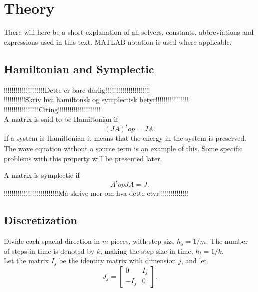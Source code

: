 

\chapter{Theory}
There will here be a short explanation of all solvers, constants, abbreviations and expressions used in this text. MATLAB notation is used where applicable. 

\section{Hamiltonian and Symplectic}%
!!!!!!!!!!!!!!!!!!!!!Dette er bare dårlig!!!!!!!!!!!!!!!!!!!!!!!\\
!!!!!!!!!!!Skriv hva hamiltonsk og symplectisk betyr!!!!!!!!!!!!!!!!!\\
!!!!!!!!!!!!!!!!!!Citing!!!!!!!!!!!!!!!!!!!!!!\\
A matrix is said to be Hamiltonian if 
\begin{equation}
(JA)^top = JA.
\end{equation}
If a system is Hamiltonian it means that the energy in the system is preserved. The wave equation without a source term is an example of this. Some specific problems with this property will be presented later.

A matrix is symplectic if 
\begin{equation}
A^top J A = J.
\end{equation}
!!!!!!!!!!!!!!!!!!!!!!!!!!!!Må skrive mer om hva dette etyr!!!!!!!!!!!!!!!\\


\section{Discretization}%
Divide each spacial direction in $m$ pieces, with step size $h_s = 1/m$. The number of steps in time is denoted by $k$, making the step size in time, $h_t = 1/k$.\\

Let the matrix $I_j$ be the identity matrix with dimension $j$, and let 
\begin{equation}
J_j = 
\begin{bmatrix}
0&I_j\\-I_j&0
\end{bmatrix}.
\end{equation}

